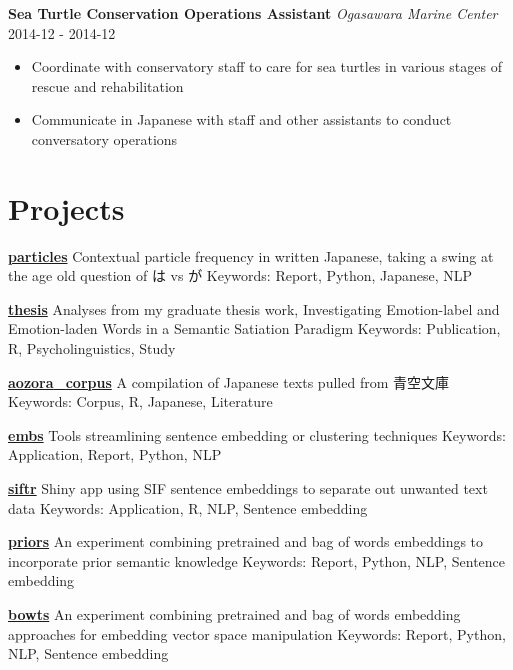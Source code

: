 \documentclass[a4paper,9pt]{extarticle}
\begin{document}
\noindent
\textbf{Sea Turtle Conservation Operations Assistant}
\noindent
\textit{Ogasawara Marine Center} \hfill 2014-12 - 2014-12
\begin{itemize}
\item Coordinate with conservatory staff to care for sea turtles in various stages of rescue and rehabilitation
\item Communicate in Japanese with staff and other assistants to conduct conversatory operations
\end{itemize}

\section*{Projects}

\noindent
\textbf{\href{https://github.com/ryancahildebrandt/particles}{particles}}
Contextual particle frequency in written Japanese, taking a swing at the age old question of は vs が
Keywords: Report, Python, Japanese, NLP

\noindent
\textbf{\href{https://github.com/ryancahildebrandt/thesis}{thesis}}
Analyses from my graduate thesis work, Investigating Emotion-label and Emotion-laden Words in a Semantic Satiation Paradigm
Keywords: Publication, R, Psycholinguistics, Study

\noindent
\textbf{\href{https://github.com/ryancahildebrandt/aozora_corpus}{aozora{\_}corpus}}
A compilation of Japanese texts pulled from 青空文庫
Keywords: Corpus, R, Japanese, Literature

\noindent
\textbf{\href{https://github.com/ryancahildebrandt/embs}{embs}}
Tools streamlining sentence embedding or clustering techniques
Keywords: Application, Report, Python, NLP

\noindent
\textbf{\href{https://github.com/ryancahildebrandt/siftr}{siftr}}
Shiny app using SIF sentence embeddings to separate out unwanted text data
Keywords: Application, R, NLP, Sentence embedding

\noindent
\textbf{\href{https://github.com/ryancahildebrandt/priors}{priors}}
An experiment combining pretrained and bag of words embeddings to incorporate prior semantic knowledge
Keywords: Report, Python, NLP, Sentence embedding

\noindent
\textbf{\href{https://github.com/ryancahildebrandt/bowts}{bowts}}
An experiment combining pretrained and bag of words embedding approaches for embedding vector space manipulation
Keywords: Report, Python, NLP, Sentence embedding
\end{document}
